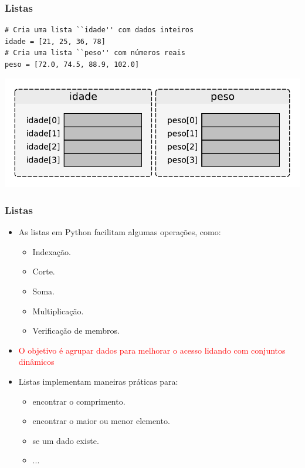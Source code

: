 \documentclass{beamer}
\begin{document}
\begin{frame}[fragile]
\frametitle{Listas}

\begin{verbatim}
# Cria uma lista ``idade'' com dados inteiros
idade = [21, 25, 36, 78]
# Cria uma lista ``peso'' com números reais
peso = [72.0, 74.5, 88.9, 102.0]
\end{verbatim}

    \vfill\begin{center}
    \includegraphics[scale=0.6]{./figures/listas_01.pdf}
    \end{center}


\end{frame}

\begin{frame}[fragile]
    \frametitle{Listas}
    
    \small
    \begin{itemize}
     \item As listas em Python facilitam algumas operações, como:
        
        \begin{itemize}\small
            \item Indexação.
            \item Corte.
            \item Soma.
            \item Multiplicação.
            \item Verificação de membros.
     \end{itemize}

     
    \item \textcolor{red}{O objetivo é agrupar dados para melhorar o acesso lidando com conjuntos dinâmicos}
     
    \item Listas implementam maneiras práticas para:
        \begin{itemize} \small
         \item encontrar o comprimento.
         \item encontrar o maior ou menor elemento.
         \item se um dado existe.
         \item ...
        \end{itemize}
    
    \end{itemize}
\end{frame}
\end{document}
